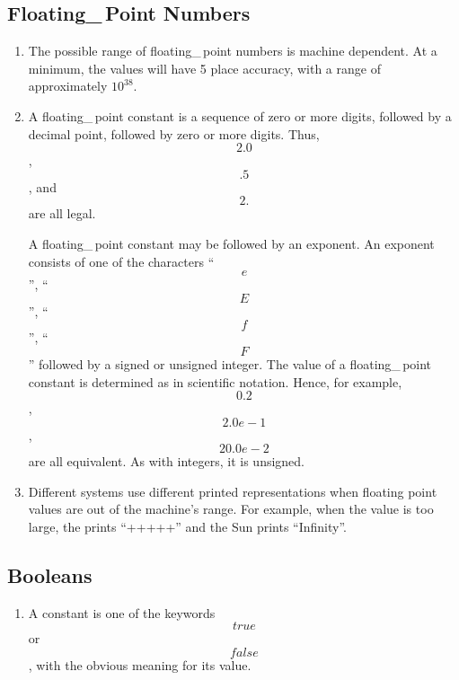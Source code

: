     \subsection{Floating\_\,Point Numbers}
    \begin{enumerate}
    \item
     
    The possible range of floating\_\,point numbers is machine dependent.
    At a minimum, the values will have 5 place accuracy, with a range of
    approximately $10^{38}$.
    \item
    A floating\_\,point constant is a sequence of zero or more digits,
    followed by a decimal point,
    followed by zero or more digits.
    Thus, \[2.0\], \[.5\], and \[2.\] are all legal.
    
    A floating\_\,point constant may be followed by an exponent.
    An exponent consists of one of the characters ``\[e\]'',
    ``\[E\]'', ``\[f\]'', ``\[F\]'' followed by a signed or unsigned
    integer.
    The value of a floating\_\,point constant
    is determined as in scientific notation.
    Hence, for example, \[0.2\], \[2.0e-1\], \[20.0e-2\] are all equivalent.
    As with integers, it is unsigned.

    \item
    Different systems use different printed representations when
    floating point values are out of the machine's range.
    For example, when the value is too large, the 
    prints ``+++++'' and the Sun prints ``Infinity''.
    \end{enumerate}

    \subsection{Booleans}
    \begin{enumerate}
    \item
    A  constant is one of the keywords 
    \[true\] or \[false\],
    with the obvious meaning for its value.
    \end{enumerate}

